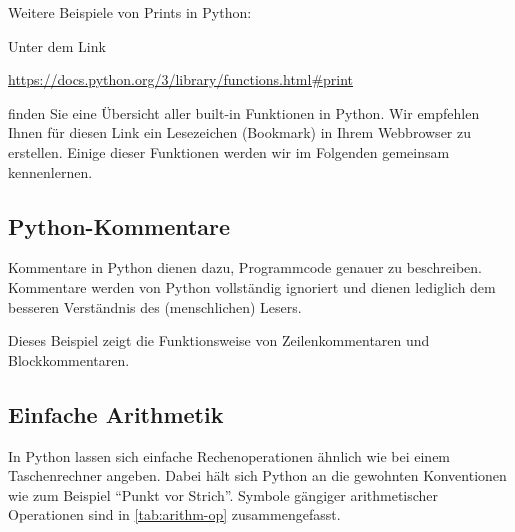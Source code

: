 \begin{myexample}\label{myexample:prints}
Weitere Beispiele von Prints in Python:

\end{myexample}

\begin{myremark}\label{myremark:builtin}
	Unter dem Link
	\begin{center}
		\url{https://docs.python.org/3/library/functions.html#print}
	\end{center}
	finden Sie eine Übersicht aller built-in Funktionen in Python. Wir empfehlen Ihnen für diesen Link ein Lesezeichen (Bookmark) in Ihrem Webbrowser zu erstellen.
	Einige dieser Funktionen werden wir im Folgenden gemeinsam kennenlernen.
\end{myremark}

\subsection{Python-Kommentare}
Kommentare in Python dienen dazu, Programmcode genauer zu beschreiben. Kommentare werden von Python vollständig ignoriert und dienen lediglich dem besseren Verständnis des (menschlichen) Lesers.
\begin{myexample}\label{myexample:kommentare}
Dieses Beispiel zeigt die Funktionsweise von Zeilenkommentaren und Blockkommentaren.

\end{myexample}

\subsection{Einfache Arithmetik}
In Python lassen sich einfache Rechenoperationen ähnlich wie bei einem Taschenrechner angeben. Dabei hält sich Python an die gewohnten Konventionen wie zum Beispiel \enquote{Punkt vor Strich}. Symbole gängiger arithmetischer Operationen sind in \cref{tab:arithm-op} zusammengefasst.

